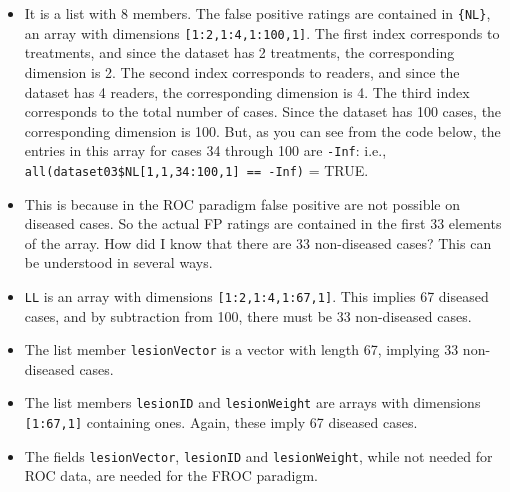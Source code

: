 \documentclass[]{book}
\newenvironment{Shaded}{\begin{snugshade}}{\end{snugshade}}
\newcommand{\CommentTok}[1]{\textcolor[rgb]{0.56,0.35,0.01}{\textit{#1}}}
\newcommand{\KeywordTok}[1]{\textcolor[rgb]{0.13,0.29,0.53}{\textbf{#1}}}
\newcommand{\NormalTok}[1]{#1}
\begin{document}
\begin{Shaded}
\end{Shaded}

\begin{itemize}
\item
  It is a list with 8 members. The false positive ratings are contained in \texttt{\{NL\}}, an array
  with dimensions \texttt{{[}1:2,1:4,1:100,1{]}}. The first index corresponds to treatments, and since the
  dataset has 2 treatments, the corresponding dimension is 2. The second index corresponds to
  readers, and since the dataset has 4 readers, the corresponding dimension is 4. The third index
  corresponds to the total number of cases. Since the dataset has 100 cases, the corresponding
  dimension is 100. But, as you can see from the code below, the entries in this array for cases 34
  through 100 are \texttt{-Inf}: i.e., \texttt{all(dataset03\$NL{[}1,1,34:100,1{]}\ ==\ -Inf)} = TRUE.
\item
  This is because in the ROC paradigm false positive are not possible on diseased cases. So the actual FP ratings are contained in the first 33 elements of the array. How did I know that there are 33 non-diseased cases? This can be understood in several ways.
\item
  \texttt{LL} is an array with dimensions \texttt{{[}1:2,1:4,1:67,1{]}}. This implies 67 diseased cases, and by subtraction from 100, there must be 33 non-diseased cases.
\item
  The list member \texttt{lesionVector} is a vector with length 67, implying 33 non-diseased cases.
\item
  The list members \texttt{lesionID} and \texttt{lesionWeight} are arrays with dimensions \texttt{{[}1:67,1{]}} containing ones. Again, these imply 67 diseased cases.
\item
  The fields \texttt{lesionVector}, \texttt{lesionID} and \texttt{lesionWeight}, while not needed for ROC data, are needed for the FROC paradigm.
\end{itemize}
\end{document}
